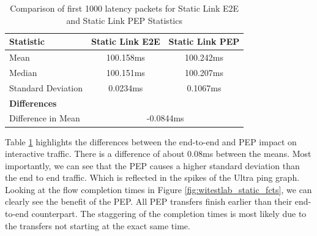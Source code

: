 \documentclass[a4paper,english, 11pt]{report}
\begin{document}
\begin{table}[h!]
\centering
\begin{tabular}{lcc}
\hline
\textbf{Statistic}                & \textbf{Static Link E2E} & \textbf{Static Link PEP} \\ \hline
Mean                              & 100.158ms                  & 100.242ms                  \\
Median                            & 100.151ms                  & 100.207ms                  \\
Standard Deviation                & 0.0234ms                   & 0.1067ms                   \\
\multicolumn{3}{l}{\textbf{Differences}}                             \\ \hline
Difference in Mean                & \multicolumn{2}{c}{-0.0844ms}         \\
\end{tabular}
\caption{Comparison of first 1000 latency packets for Static Link E2E and Static Link PEP Statistics}
\label{tab:sl_latency_statistics}
\end{table}

Table \ref{tab:sl_latency_statistics} highlights the differences between the end-to-end and PEP impact on interactive traffic. There is a difference of about 0.08ms between the means. Most importantly, we can see that the PEP causes a higher standard deviation than the end to end traffic. Which is reflected in the spikes of the Ultra ping graph.\\

Looking at the flow completion times in Figure \ref{fig:witestlab_static_fcts}, we can clearly see the benefit of the PEP. All PEP transfers finish earlier than their end-to-end counterpart. The staggering of the completion times is most likely due to the transfers not starting at the exact same time.\\
\end{document}
